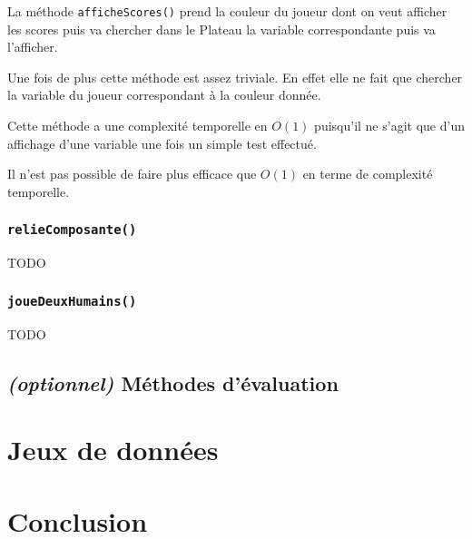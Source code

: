 \documentclass{article}
\newcommand{\info}{\texttt}
\begin{document}
                La méthode \info{afficheScores()} prend la couleur du joueur dont on veut afficher les scores puis va chercher dans le Plateau la variable correspondante puis va l'afficher.
                
                Une fois de plus cette méthode est assez triviale. En effet elle ne fait que chercher la variable du joueur correspondant à la couleur donnée.
                
                Cette méthode a une complexité temporelle en $O(1)$ puisqu'il ne s'agit que d'un affichage d'une variable une fois un simple test effectué.
                
                Il n'est pas possible de faire plus efficace que $O(1)$ en terme de complexité temporelle.
                
            \subsubsection{\info{relieComposante()}}
                
                TODO
                
            \subsubsection{\info{joueDeuxHumains()}}
            
                TODO

    \subsection{\emph{(optionnel)} Méthodes d'évaluation}

\section{Jeux de données}

\section{Conclusion}
\end{document}
